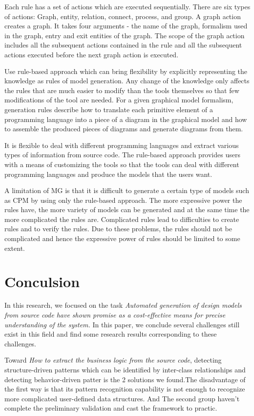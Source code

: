 \documentclass[acmsmall]{acmart}
\begin{document}
Each rule has a set of actions which are executed sequentially. There are six types of actions: Graph, entity, relation, connect, process, and group. A graph action creates a graph. It takes four arguments - the name of the graph, formalism used in the graph, entry and exit entities of the graph. The scope of the graph action includes all the subsequent actions contained in the rule and all the subsequent actions executed before the next graph action is executed.

Use rule-based approach which can bring flexibility by explicitly representing the knowledge as rules of model generation. Any change of the knowledge only affects the rules that are much easier to modify than the tools themselves so that few modifications of the tool are needed. For a given graphical model formalism, generation rules describe how to translate each primitive element of a programming language into a piece of a diagram in the graphical model and how to assemble the produced pieces of diagrams and generate diagrams from them.

It is flexible to deal with different programming languages and extract various types of information from source code. The rule-based approach provides users with a means of customizing the tools so that the tools can deal with different programming languages and produce the models that the users want.


A limitation of MG is that it is difficult to generate a certain type of models such as CPM by using only the rule-based approach. The more expressive power the rules have, the more variety of models can be generated and at the same time the more complicated the rules are. Complicated rules lead to difficulties to create rules and to verify the rules. Due to these problems, the rules should not be complicated and hence the expressive power of rules should be limited to some extent.
\section{Conculsion}
In this research, we focused on the task {\itshape Automated generation of design models 
from source code have shown promise as a cost-effective means for precise understanding of the system.} 
In this paper, we conclude several challenges still exist in this field and find some research results 
corresponding to these challenges.


Toward {\itshape How to extract the business logic from the source code}, detecting structure-driven patterns which can be identified by
inter-class relationships and detecting behavior-driven patter is the 2 solutions we found.The disadvantage of the first way is that its pattern recognition capability is not enough to
recognize more complicated user-defined data structures. And The second group haven’t complete the preliminary validation and cast the framework to
practic.
\end{document}
